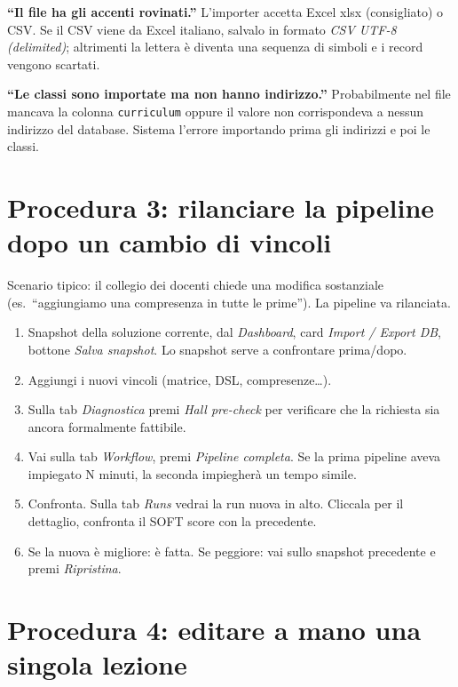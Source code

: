 \begin{erroricomunibox}
\textbf{``Il file ha gli accenti rovinati.''} L'importer
accetta Excel xlsx (consigliato) o CSV. Se il CSV viene da
Excel italiano, salvalo in formato \emph{CSV UTF-8 (delimited)};
altrimenti la lettera \`e diventa una sequenza di simboli e i
record vengono scartati.

\textbf{``Le classi sono importate ma non hanno indirizzo.''}
Probabilmente nel file mancava la colonna \texttt{curriculum}
oppure il valore non corrispondeva a nessun indirizzo del
database. Sistema l'errore importando prima gli indirizzi e
poi le classi.
\end{erroricomunibox}


\section{Procedura 3: rilanciare la pipeline dopo un cambio di vincoli}
\label{sec:wf_relancia}

Scenario tipico: il collegio dei docenti chiede una modifica
sostanziale (es.\ ``aggiungiamo una compresenza in tutte le
prime''). La pipeline va rilanciata.

\begin{enumerate}
\item Snapshot della soluzione corrente, dal \emph{Dashboard},
  card \emph{Import / Export DB}, bottone \emph{Salva snapshot}.
  Lo snapshot serve a confrontare prima/dopo.
\item Aggiungi i nuovi vincoli (matrice, DSL, compresenze\dots).
\item Sulla tab \emph{Diagnostica} premi \emph{Hall pre-check}
  per verificare che la richiesta sia ancora formalmente
  fattibile.
\item Vai sulla tab \emph{Workflow}, premi \emph{Pipeline
  completa}. Se la prima pipeline aveva impiegato N minuti, la
  seconda impiegher\`a un tempo simile.
\item Confronta. Sulla tab \emph{Runs} vedrai la run nuova in
  alto. Cliccala per il dettaglio, confronta il SOFT score con
  la precedente.
\item Se la nuova \`e migliore: \`e fatta. Se peggiore: vai
  sullo snapshot precedente e premi \emph{Ripristina}.
\end{enumerate}

\section{Procedura 4: editare a mano una singola lezione}
\label{sec:wf_edit_manuale}

